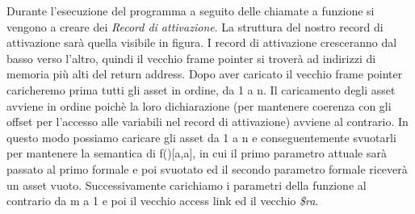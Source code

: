 \documentclass[12pt, a4paper]{report}
\begin{document}
Durante l'esecuzione del programma a seguito delle chiamate a funzione si vengono a creare dei \emph{Record di attivazione}. La struttura del nostro record di attivazione sarà quella visibile in figura. I record di attivazione cresceranno dal basso verso l'altro, quindi il vecchio frame pointer si troverà ad indirizzi di memoria più alti del return address. Dopo aver caricato il vecchio frame pointer caricheremo prima tutti gli asset in ordine, da 1 a n. Il caricamento degli asset avviene in ordine poichè la loro dichiarazione (per mantenere coerenza con gli offset per l'accesso alle variabili nel record di attivazione) avviene al contrario. In questo modo possiamo caricare gli asset da 1 a n e conseguentemente svuotarli per mantenere la semantica di f()[a,a], in cui il primo parametro attuale sarà passato al primo formale e poi svuotato ed il secondo parametro formale riceverà un asset vuoto.  Successivamente carichiamo i parametri della funzione al contrario da m a 1 e poi il vecchio access link ed il vecchio \emph{\$ra}.
\end{document}
